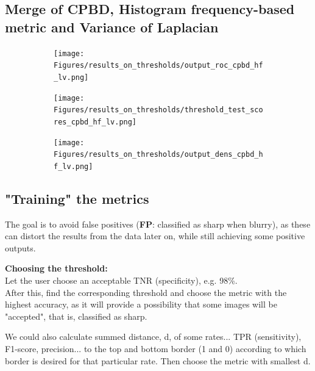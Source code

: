 \subsection{Merge of CPBD, Histogram frequency-based metric and Variance of Laplacian}
\begin{figure}[H]
    \centering
    \begin{subfigure}[t]{0.48\textwidth}
        \texttt{[image: Figures/results\_on\_thresholds/output\_roc\_cpbd\_hf\_lv.png]}
        \caption{}
        \label{fig:CPBD_HF_LV_roc}
    \end{subfigure}\hspace{1em}
    \begin{subfigure}[t]{0.48\textwidth}
        \texttt{[image: Figures/results\_on\_thresholds/threshold\_test\_scores\_cpbd\_hf\_lv.png]}
        \caption{}
        \label{fig:CPBD_HF_LV_thresh}
    \end{subfigure}\hspace{1em}
    \begin{subfigure}[t]{0.48\textwidth}
        \texttt{[image: Figures/results\_on\_thresholds/output\_dens\_cpbd\_hf\_lv.png]}
        \caption{}
        \label{fig:CPBD_HF_LV_dens}
    \end{subfigure}\hspace{1em}
    \caption{}
    \label{fig:CPBD_HF_LV_final}
\end{figure}
\fi

\subsection{"Training" the metrics}
The goal is to avoid false positives (\textbf{FP}: classified as sharp when blurry), as these can distort the results from the data later on, while still achieving some positive outputs.

\textbf{Choosing the threshold:}\\
Let the user choose an acceptable TNR (specificity), e.g. 98\%.\\
After this, find the corresponding threshold and choose the metric with the highest accuracy, as it will provide a possibility that some images will be "accepted", that is, classified as sharp. 

We could also calculate summed distance, d, of some rates... TPR (sensitivity), F1-score, precision...  to the top and bottom border (1 and 0) according to which border is desired for that particular rate. Then choose the metric with smallest d.


